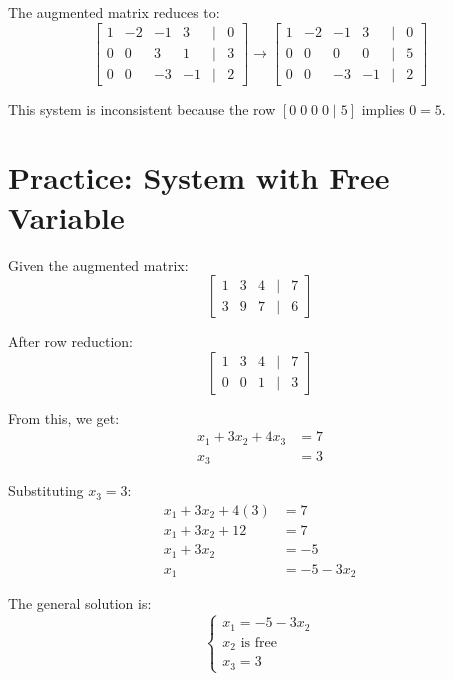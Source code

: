 \documentclass{article}
\begin{document}
The augmented matrix reduces to:
\[
\begin{bmatrix}
1 & -2 & -1 & 3 & | & 0 \\
0 & 0 & 3 & 1 & | & 3 \\
0 & 0 & -3 & -1 & | & 2
\end{bmatrix}
\rightarrow
\begin{bmatrix}
1 & -2 & -1 & 3 & | & 0 \\
0 & 0 & 0 & 0 & | & 5 \\
0 & 0 & -3 & -1 & | & 2
\end{bmatrix}
\]

This system is inconsistent because the row $[0 \; 0 \; 0 \; 0 \; | \; 5]$ implies $0 = 5$.

\section*{Practice: System with Free Variable}
Given the augmented matrix:
\[
\begin{bmatrix}
1 & 3 & 4 & | & 7 \\
3 & 9 & 7 & | & 6
\end{bmatrix}
\]

After row reduction:
\[
\begin{bmatrix}
1 & 3 & 4 & | & 7 \\
0 & 0 & 1 & | & 3
\end{bmatrix}
\]

From this, we get:
\begin{align*}
x_1 + 3x_2 + 4x_3 &= 7 \\
x_3 &= 3
\end{align*}

Substituting $x_3 = 3$:
\begin{align*}
x_1 + 3x_2 + 4(3) &= 7 \\
x_1 + 3x_2 + 12 &= 7 \\
x_1 + 3x_2 &= -5 \\
x_1 &= -5 - 3x_2
\end{align*}

The general solution is:
\[
\begin{cases}
x_1 = -5 - 3x_2 \\
x_2 \text{ is free} \\
x_3 = 3
\end{cases}
\]
\end{document}
